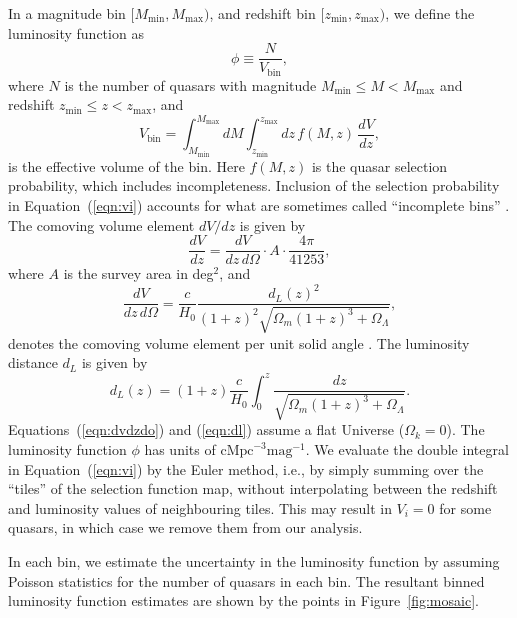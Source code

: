 \documentclass[a4paper,fleqn,usenatbib]{mnras}
\begin{document}
In a magnitude bin $[M_\mathrm{min}, M_\mathrm{max})$, and redshift
  bin $[z_\mathrm{min}, z_\mathrm{max})$, we define the luminosity
    function as \citep{2000MNRAS.311..433P}
  \begin{equation}
    \phi \equiv \frac{N}{V_\mathrm{bin}},
  \end{equation}
  where $N$ is the number of quasars with magnitude
  $M_\mathrm{min}\leq M<M_\mathrm{max}$ and redshift
  $z_\mathrm{min}\leq z<z_\mathrm{max}$, and
  \begin{equation}
    V_\mathrm{bin} = \int_{M_\mathrm{min}}^{M_\mathrm{max}}dM\int_{z_\mathrm{min}}^{z_\mathrm{max}}dz\, f(M, z)\,\frac{dV}{dz},
    \label{eqn:vi}
  \end{equation}
  is the effective volume of the bin.  Here $f(M,z)$ is the quasar
  selection probability, which includes incompleteness.  Inclusion of
  the selection probability in Equation~(\ref{eqn:vi}) accounts for
  what are sometimes called ``incomplete bins''
  \citep{2006AJ....131.2766R}.  The comoving volume element $dV/dz$ is
  given by
  \begin{equation}
    \frac{dV}{dz}=\frac{dV}{dz\,d\Omega}\cdot A\cdot\frac{4\pi}{41253},
  \end{equation}
  where $A$ is the survey area in deg$^2$, and 
  \begin{equation}
    \frac{dV}{dz\,d\Omega}=\frac{c}{H_0}\frac{d_L(z)^2}{(1+z)^2\sqrt{\Omega_m(1+z)^3+\Omega_\Lambda}},
    \label{eqn:dvdzdo}
  \end{equation}
  denotes the comoving volume element per unit solid angle
  \citep{1999astro.ph..5116H}.  The luminosity distance $d_L$ is given
  by
  \begin{equation}
    d_L(z)=(1+z)\frac{c}{H_0}\int_0^z\frac{dz}{\sqrt{\Omega_m(1+z)^3+\Omega_\Lambda}}.
    \label{eqn:dl}
  \end{equation}
  Equations~(\ref{eqn:dvdzdo}) and (\ref{eqn:dl}) assume a flat
  Universe ($\Omega_k=0$).  The luminosity function $\phi$ has units
  of $\mathrm{cMpc}^{-3}\mathrm{mag}^{-1}$.  We evaluate the double
  integral in Equation~(\ref{eqn:vi}) by the Euler method, i.e., by
  simply summing over the ``tiles'' of the selection function map,
  without interpolating between the redshift and luminosity values of
  neighbouring tiles.  This may result in $V_i=0$ for some quasars, in
  which case we remove them from our analysis.

  In each bin, we estimate the uncertainty in the luminosity function
  by assuming Poisson statistics \citep{1986ApJ...303..336G} for the
  number of quasars in each bin.  The resultant binned luminosity
  function estimates are shown by the points in
  Figure~\ref{fig:mosaic}.
\end{document}

